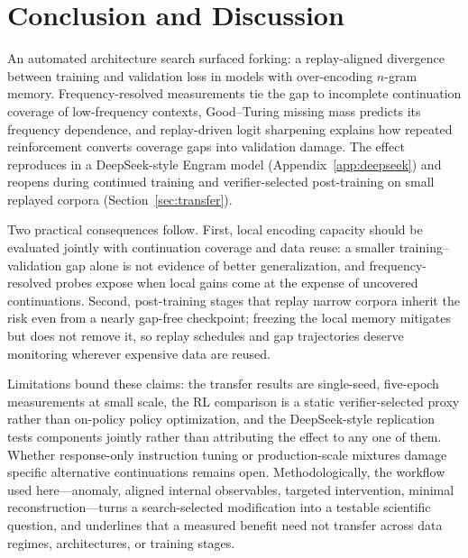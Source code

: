 \section{Conclusion and Discussion}
\label{sec:discussion}

An automated architecture search surfaced forking: a replay-aligned divergence between training and validation loss in models with over-encoding $n$-gram memory. Frequency-resolved measurements tie the gap to incomplete continuation coverage of low-frequency contexts, Good--Turing missing mass predicts its frequency dependence, and replay-driven logit sharpening explains how repeated reinforcement converts coverage gaps into validation damage. The effect reproduces in a DeepSeek-style Engram model (Appendix~\ref{app:deepseek}) and reopens during continued training and verifier-selected post-training on small replayed corpora (Section~\ref{sec:transfer}).

Two practical consequences follow. First, local encoding capacity should be evaluated jointly with continuation coverage and data reuse: a smaller training--validation gap alone is not evidence of better generalization, and frequency-resolved probes expose when local gains come at the expense of uncovered continuations. Second, post-training stages that replay narrow corpora inherit the risk even from a nearly gap-free checkpoint; freezing the local memory mitigates but does not remove it, so replay schedules and gap trajectories deserve monitoring wherever expensive data are reused.

Limitations bound these claims: the transfer results are single-seed, five-epoch measurements at small scale, the RL comparison is a static verifier-selected proxy rather than on-policy policy optimization, and the DeepSeek-style replication tests components jointly rather than attributing the effect to any one of them. Whether response-only instruction tuning or production-scale mixtures damage specific alternative continuations remains open. Methodologically, the workflow used here---anomaly, aligned internal observables, targeted intervention, minimal reconstruction---turns a search-selected modification into a testable scientific question, and underlines that a measured benefit need not transfer across data regimes, architectures, or training stages.
